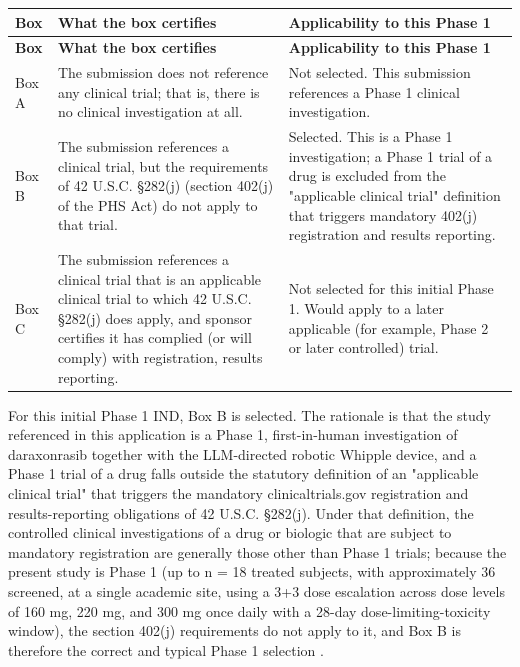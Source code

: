 \begin{center}
\begin{xltabular}{\textwidth}{>{\raggedright\arraybackslash}p{1.2cm} Y >{\raggedright\arraybackslash}p{5.5cm}}
\toprule
\textbf{Box} & \textbf{What the box certifies} & \textbf{Applicability to this Phase 1} \\
\midrule
\endfirsthead
\toprule
\textbf{Box} & \textbf{What the box certifies} & \textbf{Applicability to this Phase 1} \\
\midrule
\endhead
\bottomrule
\endfoot
Box A & The submission does not reference any clinical trial; that is, there is no clinical investigation at all. & Not selected. This submission references a Phase 1 clinical investigation. \\
Box B & The submission references a clinical trial, but the requirements of 42 U.S.C. \S 282(j) (section 402(j) of the PHS Act) do not apply to that trial. & Selected. This is a Phase 1 investigation; a Phase 1 trial of a drug is excluded from the "applicable clinical trial" definition that triggers mandatory 402(j) registration and results reporting. \\
Box C & The submission references a clinical trial that is an applicable clinical trial to which 42 U.S.C. \S 282(j) does apply, and sponsor certifies it has complied (or will comply) with registration, results reporting. & Not selected for this initial Phase 1. Would apply to a later applicable (for example, Phase 2 or later controlled) trial. \\
\bottomrule
\end{xltabular}
\end{center}
\vspace{-1.75cm}

For this initial Phase 1 IND, Box B is selected. The rationale is that
the study referenced in this application is a Phase 1, first-in-human
investigation of daraxonrasib together with the LLM-directed robotic
Whipple device, and a Phase 1 trial of a drug falls outside the
statutory definition of an "applicable clinical trial" that triggers the
mandatory clinicaltrials.gov registration and results-reporting
obligations of 42 U.S.C. \S 282(j). Under that definition, the
controlled clinical investigations of a drug or biologic that are subject
to mandatory registration are generally those other than Phase 1 trials;
because the present study is Phase 1 (up to n = 18 treated subjects, with
approximately 36 screened, at a single academic site, using a 3+3 dose
escalation across dose levels of 160 mg, 220 mg, and 300 mg once daily
with a 28-day dose-limiting-toxicity window), the section 402(j)
requirements do not apply to it, and Box B is therefore the correct and
typical Phase 1 selection \cite{phase1guidance, oncotrialllm}.


